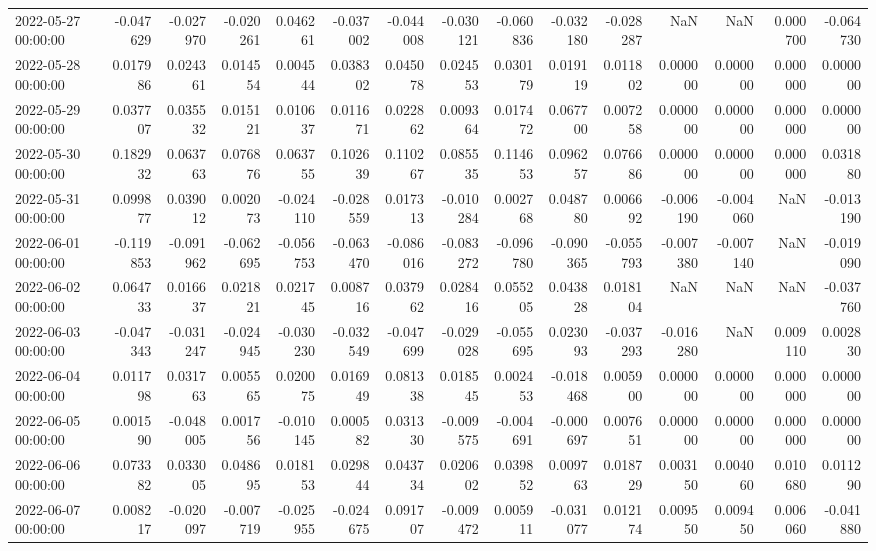 \begin{tabular}{lrrrrrrrrrrrrrr}
2022-05-27 00:00:00 & -0.047629 & -0.027970 & -0.020261 & 0.046261 & -0.037002 & -0.044008 & -0.030121 & -0.060836 & -0.032180 & -0.028287 & NaN & NaN & 0.000700 & -0.064730 \\
2022-05-28 00:00:00 & 0.017986 & 0.024361 & 0.014554 & 0.004544 & 0.038302 & 0.045078 & 0.024553 & 0.030179 & 0.019119 & 0.011802 & 0.000000 & 0.000000 & 0.000000 & 0.000000 \\
2022-05-29 00:00:00 & 0.037707 & 0.035532 & 0.015121 & 0.010637 & 0.011671 & 0.022862 & 0.009364 & 0.017472 & 0.067700 & 0.007258 & 0.000000 & 0.000000 & 0.000000 & 0.000000 \\
2022-05-30 00:00:00 & 0.182932 & 0.063763 & 0.076876 & 0.063755 & 0.102639 & 0.110267 & 0.085535 & 0.114653 & 0.096257 & 0.076686 & 0.000000 & 0.000000 & 0.000000 & 0.031880 \\
2022-05-31 00:00:00 & 0.099877 & 0.039012 & 0.002073 & -0.024110 & -0.028559 & 0.017313 & -0.010284 & 0.002768 & 0.048780 & 0.006692 & -0.006190 & -0.004060 & NaN & -0.013190 \\
2022-06-01 00:00:00 & -0.119853 & -0.091962 & -0.062695 & -0.056753 & -0.063470 & -0.086016 & -0.083272 & -0.096780 & -0.090365 & -0.055793 & -0.007380 & -0.007140 & NaN & -0.019090 \\
2022-06-02 00:00:00 & 0.064733 & 0.016637 & 0.021821 & 0.021745 & 0.008716 & 0.037962 & 0.028416 & 0.055205 & 0.043828 & 0.018104 & NaN & NaN & NaN & -0.037760 \\
2022-06-03 00:00:00 & -0.047343 & -0.031247 & -0.024945 & -0.030230 & -0.032549 & -0.047699 & -0.029028 & -0.055695 & 0.023093 & -0.037293 & -0.016280 & NaN & 0.009110 & 0.002830 \\
2022-06-04 00:00:00 & 0.011798 & 0.031763 & 0.005565 & 0.020075 & 0.016949 & 0.081338 & 0.018545 & 0.002453 & -0.018468 & 0.005900 & 0.000000 & 0.000000 & 0.000000 & 0.000000 \\
2022-06-05 00:00:00 & 0.001590 & -0.048005 & 0.001756 & -0.010145 & 0.000582 & 0.031330 & -0.009575 & -0.004691 & -0.000697 & 0.007651 & 0.000000 & 0.000000 & 0.000000 & 0.000000 \\
2022-06-06 00:00:00 & 0.073382 & 0.033005 & 0.048695 & 0.018153 & 0.029844 & 0.043734 & 0.020602 & 0.039852 & 0.009763 & 0.018729 & 0.003150 & 0.004060 & 0.010680 & 0.011290 \\
2022-06-07 00:00:00 & 0.008217 & -0.020097 & -0.007719 & -0.025955 & -0.024675 & 0.091707 & -0.009472 & 0.005911 & -0.031077 & 0.012174 & 0.009550 & 0.009450 & 0.006060 & -0.041880 \\

\end{tabular}
